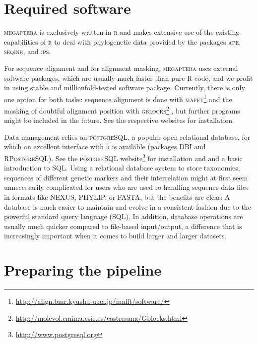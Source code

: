 \documentclass{article}
\begin{document}
\section{Required software}
\textsc{megaptera} is exclusively written in \textsc{r} and makes extensive use of the existing capabilities of \textsc{r} to deal with phylogenetic data provided by the packages \textsc{ape}, \textsc{seqinr}, and \textsc{ips}.

For sequence alignment and for alignment masking, \textsc{megaptera} uses external software packages, which are usually much faster than pure R code, and we profit in using stable and millionfold-tested software package.
Currently, there is only one option for both tasks: sequence alignment is done with \textsc{mafft}\footnote{\href{http://align.bmr.kyushu-u.ac.jp/mafft/software/}{http://align.bmr.kyushu-u.ac.jp/mafft/software/}} \citep{katohmiyata2002,katohmiyata2005,katohstandley2013} and the masking of doubtful alignment position with \textsc{gblocks}\footnote{\href{http://molevol.cmima.csic.es/castresana/Gblocks.html}{http://molevol.cmima.csic.es/castresana/Gblocks.html}} \citep{castresana2000,talaveracastresana2007}, but further programs might be included in the future. See the respective websites for installation.

Data management relies on \textsc{postgreSQL}, a popular open relational database, for which an excellent interface with \textsc{r} is available (packages \textsc{DBI} and \textsc{RPostgreSQL}). See the \textsc{postgreSQL} website\footnote{\href{http://www.postgresql.org}{http://www.postgresql.org}} for installation and and a basic introduction to SQL. Using a relational database system to store taxonomies, sequences of different genetic markers and their interrelation might at first seem unnecessarily complicated for users who are used to handling sequence data files in formats like NEXUS, PHYLIP, or FASTA, but the benefits are clear: A database is much easier to maintain and evolve in a consistent fashion due to the powerful standard query language (SQL). In addition, database operations are usually much quicker compared to file-based input/output, a difference that is increasingly important when it comes to build larger and larger datasets.

\section{Preparing the pipeline}
\end{document}
